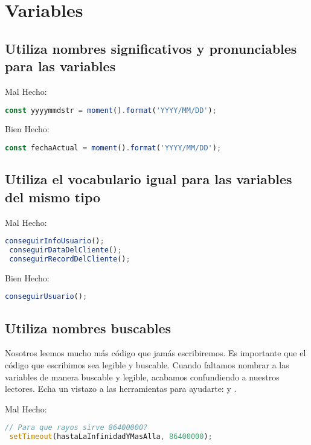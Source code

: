 \section{Variables}

\subsection*{Utiliza nombres significativos y pronunciables para las variables}

Mal Hecho:
\begin{lstlisting}[language=TypeScript, style=badstyle]
 const yyyymmdstr = moment().format('YYYY/MM/DD');
\end{lstlisting}
\vspace{0.5cm} %

Bien Hecho:
\begin{lstlisting}[language=TypeScript, style=goodstyle]
 const fechaActual = moment().format('YYYY/MM/DD');
\end{lstlisting}

\subsection*{Utiliza el vocabulario igual para las variables del mismo tipo}

Mal Hecho:
\begin{lstlisting}[language=TypeScript, style=badstyle]
 conseguirInfoUsuario();
 conseguirDataDelCliente();
 conseguirRecordDelCliente();
\end{lstlisting}
\vspace{0.5cm} %

Bien Hecho:
\begin{lstlisting}[language=TypeScript, style=goodstyle]
 conseguirUsuario();
\end{lstlisting}

\subsection*{Utiliza nombres buscables}

Nosotros leemos mucho más código que jamás escribiremos. Es importante que el código que escribimos sea legible y buscable. Cuando faltamos nombrar a las variables de manera buscable y legible, acabamos confundiendo a nuestros lectores. Echa un vistazo a las herramientas para ayudarte:  y .

Mal Hecho:
\begin{lstlisting}[language=TypeScript, style=badstyle]
 // Para que rayos sirve 86400000?
 setTimeout(hastaLaInfinidadYMasAlla, 86400000);
\end{lstlisting}
\vspace{0.5cm} %

